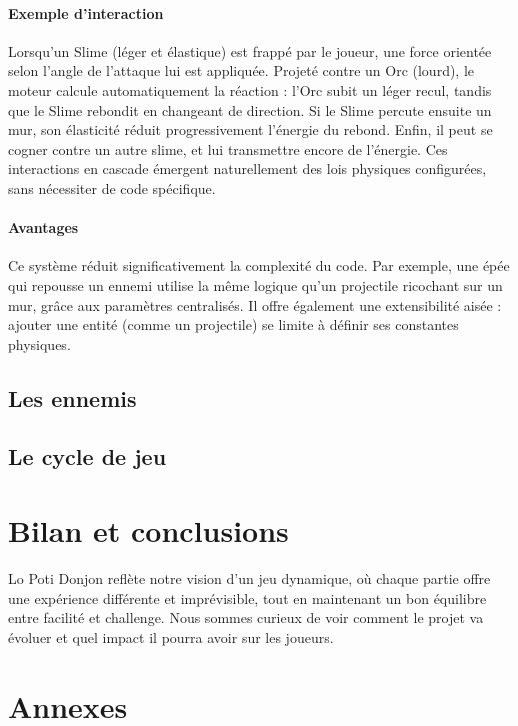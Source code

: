 \documentclass[a4paper,11pt]{article}
\begin{document}
\paragraph{Exemple d'interaction}  
Lorsqu’un Slime (léger et élastique) est frappé par le joueur, une force orientée selon l’angle de l’attaque lui est appliquée. Projeté contre un Orc (lourd), le moteur calcule automatiquement la réaction : l’Orc subit un léger recul, tandis que le Slime rebondit en changeant de direction. Si le Slime percute ensuite un mur, son élasticité réduit progressivement l’énergie du rebond. Enfin, il peut se cogner contre un autre slime, et lui transmettre encore de l’énergie. Ces interactions en cascade émergent naturellement des lois physiques configurées, sans nécessiter de code spécifique.

\paragraph{Avantages}  
Ce système réduit significativement la complexité du code. Par exemple, une épée qui repousse un ennemi utilise la même logique qu’un projectile ricochant sur un mur, grâce aux paramètres centralisés. Il offre également une extensibilité aisée : ajouter une entité (comme un projectile) se limite à définir ses constantes physiques.

\subsection{Les ennemis}

\subsection{Le cycle de jeu}

\section{Bilan et conclusions}

Lo Poti Donjon reflète notre vision d'un jeu dynamique, où chaque partie offre une expérience différente et imprévisible, tout en maintenant un bon équilibre entre facilité et challenge. Nous sommes curieux de voir comment le projet va évoluer et quel impact il pourra avoir sur les joueurs.

\section{Annexes}
\end{document}
